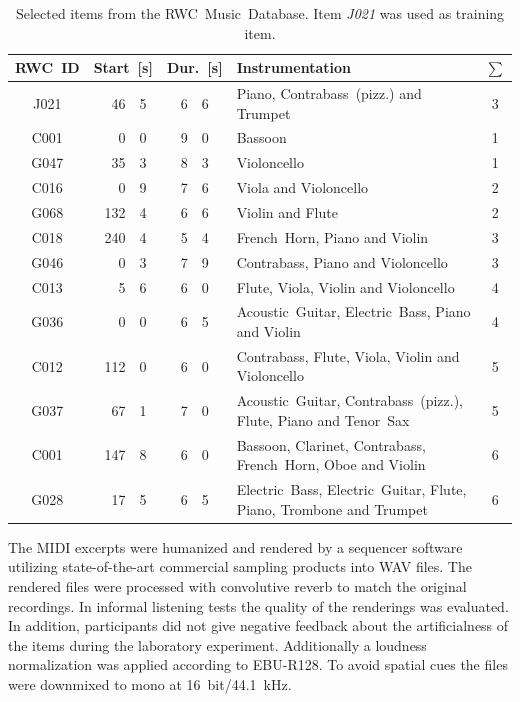 \begin{table}[htb]
\center
\tiny
\begin{tabular}{c|r@{.}l|r@{.}l|p{3.8cm}|c}
\toprule[1.5pt]
RWC~ID & \multicolumn{2}{c}{Start~[s]} & \multicolumn{2}{c}{Dur.~[s]} & Instrumentation & $\sum$\\
\midrule
\hline
J021 & 46 & 5 & 6 & 6 & Piano, Contrabass~(pizz.) and Trumpet & 3\\
\hline
\hline
C001 & 0&0 & 9&0 & Bassoon & 1  \\
G047 & 35&3 & 8&3 & Violoncello & 1 \\
\hline
C016 & 0&9 & 7&6 & Viola and Violoncello & 2\\
G068 & 132&4 & 6&6 & Violin and Flute &  2\\
\hline
C018 & 240&4 & 5&4 & French~Horn, Piano and Violin & 3\\
G046 & 0&3 & 7&9 & Contrabass, Piano and Violoncello & 3\\
\hline
C013 & 5&6 & 6&0 & Flute, Viola, Violin and Violoncello & 4\\
G036 & 0&0 & 6&5 &  Acoustic~Guitar, Electric~Bass, Piano  and Violin & 4\\
\hline
C012 & 112&0 & 6&0 & Contrabass, Flute, Viola, Violin and  Violoncello & 5\\
G037 & 67&1 & 7&0 & Acoustic~Guitar, Contrabass~(pizz.), Flute, Piano and Tenor~Sax & 5\\
\hline
C001 & 147&8 & 6&0 & Bassoon, Clarinet, Contrabass, French~Horn, Oboe and Violin & 6\\
G028 & 17&5 & 6&5 & Electric~Bass, Electric~Guitar, Flute, Piano, Trombone and Trumpet & 6\\
\hline
\bottomrule[1.5pt]
\end{tabular}
\renewcommand{\arraystretch}{1}
\caption{Selected items from the RWC~Music~Database\cite{rwc}. Item \emph{J021} was used as training item.}
\label{table:items}
\end{table}
The MIDI excerpts were humanized and rendered by a sequencer software utilizing state-of-the-art commercial sampling products into WAV files. The rendered files were processed with convolutive reverb to match the original recordings. In informal listening tests the quality of the renderings was evaluated. In addition, participants did not give negative feedback about the artificialness of the items during the laboratory experiment. Additionally a loudness normalization was applied according to EBU-R128\cite{EBU2011}. To avoid spatial cues the files were downmixed to mono at 16~bit/44.1~kHz.

